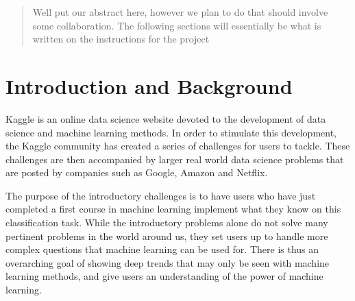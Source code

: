 \documentclass{article}
\begin{document}
 


\begin{abstract} 
Well put our abstract here, however we plan to do that should involve some collaboration. The following sections will essentially be what is written on the instructions for the project
\end{abstract} 

\section{Introduction and Background}
\label{intro}


Kaggle is an online data science website devoted to the development of data science and machine learning methods. In order to stimulate this development, the Kaggle community has created a series of challenges for users to tackle. These challenges are then accompanied by larger real world data science problems that are posted by companies such as Google, Amazon and Netflix. 

The purpose of the introductory challenges is to have users who have just completed a first course in machine learning implement what they know on this classification task. While the introductory problems alone do not solve many pertinent problems in the world around us, they set users up to handle more complex questions that machine learning can be used for. There is thus an overarching goal of showing deep trends that may only be seen with machine learning methods, and give users an understanding of the power of machine learning.
\end{document}

